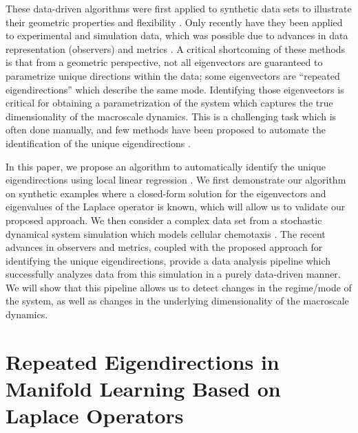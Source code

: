 %
These data-driven algorithms were first applied to synthetic data sets to illustrate their geometric properties and flexibility \cite{coifman2005geometric, nadler2006diffusion}.
%
Only recently have they been applied to experimental and simulation data, which was possible due to advances in data representation (observers) and metrics \cite{rubner2000earth,mallat2012group,talmon2013empirical,zhao2014rotationally, rohrdanz2011determination}.
%
A critical shortcoming of these methods is that from a geometric perspective, not all eigenvectors are guaranteed to parametrize unique directions within the data; some eigenvectors are ``repeated eigendirections'' which describe the same mode.
%
Identifying those eigenvectors is critical for obtaining a parametrization of the system which captures the true dimensionality of the macroscale dynamics.
%
This is a challenging task which is often done manually, and few methods have been proposed to automate the identification of the unique eigendirections \cite{gerber2007robust}.

In this paper, we propose an algorithm to automatically identify the unique eigendirections using local linear regression \cite{wasserman2006all}.
%
We first demonstrate our algorithm on synthetic examples where a closed-form solution for the eigenvectors and eigenvalues of the Laplace operator is known, which will allow us to validate our proposed approach.
%
We then consider a complex data set from a stochastic dynamical system simulation which models cellular chemotaxis \cite{othmer1988models}.
%
The recent advances in observers and metrics, coupled with the proposed approach for identifying the unique eigendirections, provide a data analysis pipeline which successfully analyzes data from this simulation in a purely data-driven manner.
%
We will show that this pipeline allows us to detect changes in the regime/mode of the system, as well as changes in the underlying dimensionality of the macroscale dynamics.


\section{Repeated Eigendirections in Manifold Learning Based on Laplace Operators}


